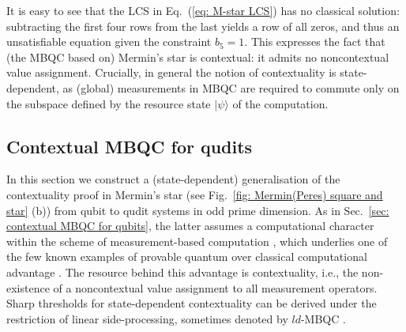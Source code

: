 \documentclass[aps,pra,letterpaper,onrcolumn,nofootinbib,notitlepage,longbibliography]{revtex4-1}
\begin{document}
It is easy to see that the LCS in Eq.~(\ref{eq: M-star LCS}) has no classical solution: subtracting the first four rows from the last yields a row of all zeros, and thus an unsatisfiable equation given the constraint $b_5=1$. This expresses the fact that (the MBQC based on) Mermin's star is contextual: it admits no noncontextual value assignment. Crucially, in general the notion of contextuality is state-dependent, as (global) measurements in MBQC are required to commute only on the subspace defined by the resource state $|\psi\rangle$ of the computation.



\subsection{Contextual MBQC for qudits}\label{sec: Contextual computation in qudit MBQC}

In this section we construct a (state-dependent) generalisation of the contextuality proof in Mermin's star \cite{Mermin1993} (see Fig.~\ref{fig: Mermin(Peres) square and star} (b)) from qubit to qudit systems in odd prime dimension. As in Sec.~\ref{sec: contextual MBQC for qubits}, the latter assumes a computational character within the scheme of measurement-based computation \cite{RaussendorfBriegel2001,BriegelRaussendorf2001,AndersBrowne2009}, which underlies one of the few known examples of provable quantum over classical computational advantage \cite{BravyiGossetKoenig2018,BravyiGossetKoenig2020}. The resource behind this advantage is contextuality, i.e., the non-existence of a noncontextual value assignment to all measurement operators. Sharp thresholds for state-dependent contextuality can be derived under the restriction of linear side-processing, sometimes denoted by $ld$-MBQC \cite{HobanCampbell2011,Raussendorf2013,FrembsRobertsBartlett2018,FrembsRobertsCampbellBartlett2022}.\\
\end{document}

